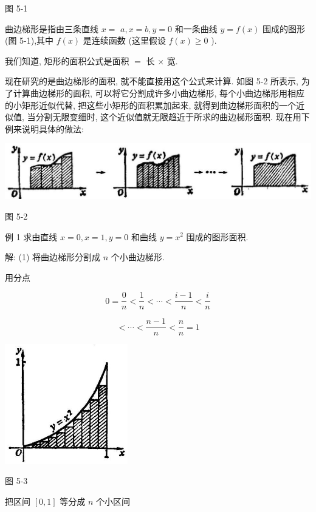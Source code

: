 \documentclass[lang=cn,newtx,10pt,scheme=chinese]{elegantbook}
\begin{document}
图 5-1

曲边梯形是指由三条直线 \(x =\) \(a,x = b,y = 0\) 和一条曲线 \(y = f\left( x\right)\) 围成的图形(图 5-1),其中 \(f\left( x\right)\) 是连续函数 (这里假设 \(f\left( x\right) \geq 0\) ).

我们知道, 矩形的面积公式是面积 \(=\) 长 \(\times\) 宽.

现在研究的是曲边梯形的面积, 就不能直接用这个公式来计算. 如图 5-2 所表示, 为了计算曲边梯形的面积, 可以将它分割成许多小曲边梯形, 每个小曲边梯形用相应的小矩形近似代替, 把这些小矩形的面积累加起来, 就得到曲边梯形面积的一个近似值, 当分割无限变细时, 这个近似值就无限趋近于所求的曲边梯形面积. 现在用下例来说明具体的做法:

\begin{center}
\includegraphics[max width=1.0\textwidth]{images/01912c18-5c3f-733d-b775-749ba9897a9d_216_513151.jpg}
\end{center}

图 5-2

例 1 求由直线 \(x = 0,x = 1,y = 0\) 和曲线 \(y = {x}^{2}\) 围成的图形面积.

解: (1) 将曲边梯形分割成 \(n\) 个小曲边梯形.

用分点

\[
0 = \frac{0}{n} < \frac{1}{n} < \cdots < \frac{i - 1}{n} < \frac{i}{n}
\]

\[
< \cdots < \frac{n - 1}{n} < \frac{n}{n} = 1
\]

\begin{center}
\includegraphics[max width=0.4\textwidth]{images/01912c18-5c3f-733d-b775-749ba9897a9d_217_504981.jpg}
\end{center}

图 5-3

把区间 \(\left\lbrack {0,1}\right\rbrack\) 等分成 \(n\) 个小区间
\end{document}
